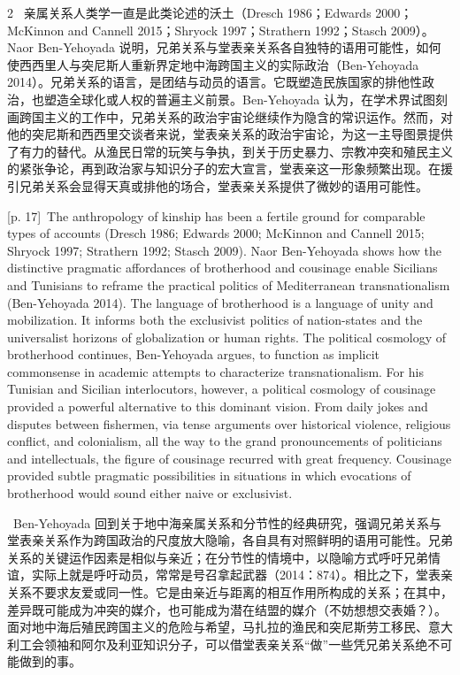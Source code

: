 \documentclass[10pt,a4paper]{article}
\begin{document}
\begin{paracol}{2}
\switchcolumn*
{\scriptsize\color{gray} [p. 17]}\ 亲属关系人类学一直是此类论述的沃土（Dresch 1986；Edwards 2000；McKinnon and Cannell 2015；Shryock 1997；Strathern 1992；Stasch 2009）。Naor Ben-Yehoyada 说明，兄弟关系与堂表亲关系各自独特的语用可能性，如何使西西里人与突尼斯人重新界定地中海跨国主义的实际政治（Ben-Yehoyada 2014）。兄弟关系的语言，是团结与动员的语言。它既塑造民族国家的排他性政治，也塑造全球化或人权的普遍主义前景。Ben-Yehoyada 认为，在学术界试图刻画跨国主义的工作中，兄弟关系的政治宇宙论继续作为隐含的常识运作。然而，对他的突尼斯和西西里交谈者来说，堂表亲关系的政治宇宙论，为这一主导图景提供了有力的替代。从渔民日常的玩笑与争执，到关于历史暴力、宗教冲突和殖民主义的紧张争论，再到政治家与知识分子的宏大宣言，堂表亲这一形象频繁出现。在援引兄弟关系会显得天真或排他的场合，堂表亲关系提供了微妙的语用可能性。\par
\switchcolumn
{\scriptsize\color{gray} [p. 17]}\ The anthropology of kinship has been a fertile ground for comparable types of accounts (Dresch 1986; Edwards 2000; McKinnon and Cannell 2015; Shryock 1997; Strathern 1992; Stasch 2009). Naor Ben-Yehoyada shows how the distinctive pragmatic affordances of brotherhood and cousinage enable Sicilians and Tunisians to reframe the practical politics of Mediterranean transnationalism (Ben-Yehoyada 2014). The language of brotherhood is a language of unity and mobilization. It informs both the exclusivist politics of nation-states and the universalist horizons of globalization or human rights. The political cosmology of brotherhood continues, Ben-Yehoyada argues, to function as implicit commonsense in academic attempts to characterize transnationalism. For his Tunisian and Sicilian interlocutors, however, a political cosmology of cousinage provided a powerful alternative to this dominant vision. From daily jokes and disputes between fishermen, via tense arguments over historical violence, religious conflict, and colonialism, all the way to the grand pronouncements of politicians and intellectuals, the figure of cousinage recurred with great frequency. Cousinage provided subtle pragmatic possibilities in situations in which evocations of brotherhood would sound either naive or exclusivist.\par
\switchcolumn*
{\scriptsize\color{gray} [p. 17]}\ Ben-Yehoyada 回到关于地中海亲属关系和分节性的经典研究，强调兄弟关系与堂表亲关系作为跨国政治的尺度放大隐喻，各自具有对照鲜明的语用可能性。兄弟关系的关键运作因素是相似与亲近；在分节性的情境中，以隐喻方式呼吁兄弟情谊，实际上就是呼吁动员，常常是号召拿起武器（2014：874）。相比之下，堂表亲关系不要求友爱或同一性。它是由亲近与距离的相互作用所构成的关系；在其中，差异既可能成为冲突的媒介，也可能成为潜在结盟的媒介（不妨想想交表婚？）。面对地中海后殖民跨国主义的危险与希望，马扎拉的渔民和突尼斯劳工移民、意大利工会领袖和阿尔及利亚知识分子，可以借堂表亲关系“做”一些凭兄弟关系绝不可能做到的事。\par

\end{paracol}
\end{document}
